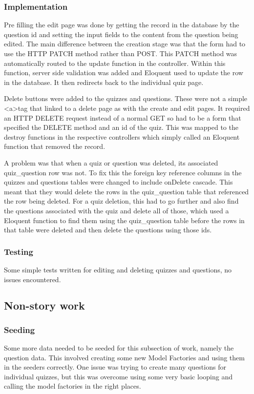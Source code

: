 \subsubsection{Implementation}
Pre filling the edit page was done by getting the record in the database by the question id and setting the input fields to the content from the question being edited. The main difference between the creation stage was that the form had to use the HTTP PATCH method rather than POST. This PATCH method was automatically routed to the update function in the controller\cite{laravel-resource-controller}. Within this function, server side validation was added and Eloquent used to update the row in the database. It then redirects back to the individual quiz page.

Delete buttons were added to the quizzes and questions. These were not a simple \textless a\textgreater tag that linked to a delete page as with the create and edit pages. It required an HTTP DELETE request instead of a normal GET so had to be a form that specified the DELETE method and an id of the quiz. This was mapped to the destroy functions in the respective controllers which simply called an Eloquent function that removed the record. 

A problem was that when a quiz or question was deleted, its associated quiz\_question row was not. To fix this the foreign key reference columns in the quizzes and questions tables were changed to include onDelete cascade. This meant that they would delete the rows in the quiz\_question table that referenced the row being deleted. For a quiz deletion, this had to go further and also find the questions associated with the quiz and delete all of those, which used a Eloquent function to find them using the quiz\_question table before the rows in that table were deleted and then delete the questions using those ids.
\subsubsection{Testing}
Some simple tests written for editing and deleting quizzes and questions, no issues encountered.
\newpage

\subsection{Non-story work}
\subsubsection{Seeding}
Some more data needed to be seeded for this subsection of work, namely the question data. This involved creating some new Model Factories and using them in the seeders correctly. One issue was trying to create many questions for individual quizzes, but this was overcome using some very basic looping and calling the model factories in the right places.
